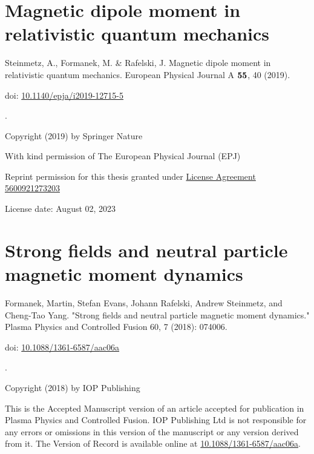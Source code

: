 \chapter{Magnetic dipole moment in relativistic quantum mechanics}
\label{appendixA}
\begin{center}
Steinmetz, A., Formanek, M. \& Rafelski, J. Magnetic dipole moment in relativistic quantum mechanics. European Physical Journal A $\boldsymbol{55}$, 40 (2019).

doi: \href{https://doi.org/10.1140/epja/i2019-12715-5}{10.1140/epja/i2019-12715-5}

.

Copyright (2019) by Springer Nature

With kind permission of The European Physical Journal (EPJ)

Reprint permission for this thesis granted under \href{https://s100.copyright.com/CustomerAdmin/PLF.jsp?ref=9a7a42d0-4511-4427-8acd-73a16083772c}{License Agreement 5600921273203}

License date: August 02, 2023
\end{center}


\chapter{Strong fields and neutral particle magnetic moment dynamics}
\label{appendixB}
\begin{center}
Formanek, Martin, Stefan Evans, Johann Rafelski, Andrew Steinmetz, and Cheng-Tao Yang. "Strong fields and neutral particle magnetic moment dynamics." Plasma Physics and Controlled Fusion 60, 7 (2018): 074006.

doi: \href{https://doi.org/10.1088/1361-6587/aac06a}{10.1088/1361-6587/aac06a}

.

Copyright (2018) by IOP Publishing

This is the Accepted Manuscript version of an article accepted for publication in Plasma Physics and Controlled Fusion.  IOP Publishing Ltd is not responsible for any errors or omissions in this version of the manuscript or any version derived from it.  The Version of Record is available online at \href{https://doi.org/10.1088/1361-6587/aac06a}{10.1088/1361-6587/aac06a}.

\end{center}


